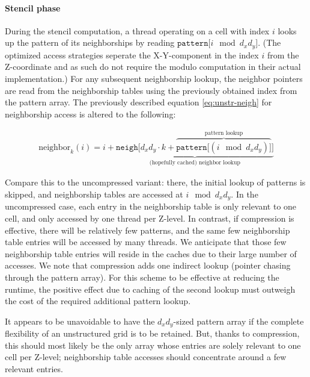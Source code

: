 \paragraph{Stencil phase}

During the stencil computation, a thread operating on a cell with index $i$ looks up the pattern of its neighborships by reading $\mathtt{pattern[}i \mod d_xd_y\mathtt{]}$. (The optimized access strategies seperate the X-Y-component in the index $i$ from the Z-coordinate and as such do not require the modulo computation in their actual implementation.) For any subsequent neighborship lookup, the neighbor pointers are read from the neighborship tables using the previously obtained index from the pattern array. The previously described equation \ref{eq:unstr-neigh} for neighborship access is altered to the following:

\begin{gather}
    \text{neighbor}_k(i) = i + \underbrace{\mathtt{neigh[}d_xd_y\cdot k + \overbrace{\mathtt{pattern[}(i \mod d_xd_y)\mathtt{]}}^\text{pattern lookup}\mathtt{]}}_\text{(hopefully cached) neighbor lookup} \label{eq:unstr-neigh-comp}
\end{gather}

Compare this to the uncompressed variant: there, the initial lookup of patterns is skipped, and neighborship tables are accessed at $i\mod d_xd_y$. In the uncompressed case, each entry in the neighborship table is only relevant to one cell, and only accessed by one thread per Z-level. In contrast, if compression is effective, there will be relatively few patterns, and the same few neighborship table entries will be accessed by many threads. We anticipate that those few neighborship table entries will reside in the caches due to their large number of accesses. We note that compression adds one indirect lookup (pointer chasing through the pattern array). For this scheme to be effective at reducing the runtime, the positive effect due to caching of the second lookup must outweigh the cost of the required additional pattern lookup.

It appears to be unavoidable to have the $d_xd_y$-sized pattern array if the complete flexibility of an unstructured grid is to be retained. But, thanks to compression, this should most likely be the only array whose entries are solely relevant to one cell per Z-level; neighborship table accesses should concentrate around a few relevant entries.

